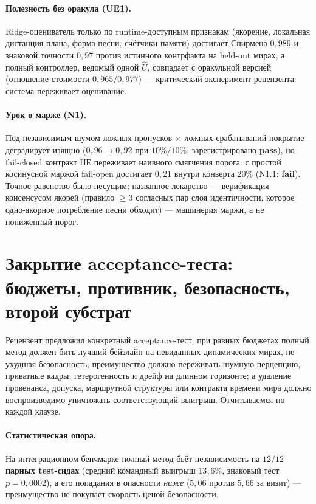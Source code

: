 \documentclass{article}
\begin{document}
\paragraph{Полезность без оракула (UE1).} Ridge-оцениватель только по
runtime-доступным признакам (якорение, локальная дистанция плана,
форма песни, счётчики памяти) достигает Спирмена $0{,}989$ и знаковой
точности $0{,}97$ против истинного контрфакта на held-out мирах, а
полный контроллер, ведомый одной $\widehat U$, совпадает с оракульной
версией (отношение стоимости $0{,}965/0{,}977$) --- критический
эксперимент рецензента: система переживает оценивание.

\paragraph{Урок о марже (N1).} Под независимым шумом ложных
пропусков $\times$ ложных срабатываний покрытие деградирует изящно
($0{,}96 \to 0{,}92$ при $10\%/10\%$: зарегистрировано
\textbf{pass}), но fail-closed контракт НЕ переживает наивного
смягчения порога: с простой косинусной маржой fail-open достигает
$0{,}21$ внутри конверта $20\%$ (N1.1: \textbf{fail}). Точное
равенство было несущим; названное лекарство --- верификация
консенсусом якорей (правило $\ge 3$ согласных пар слоя идентичности,
которое одно-якорное потребление песни обходит) --- машинерия маржи,
а не пониженный порог.


\section{Закрытие acceptance-теста: бюджеты, противник, безопасность,
второй субстрат}
\label{p5:sec:acceptance}

Рецензент предложил конкретный acceptance-тест: при равных бюджетах
полный метод должен бить лучший бейзлайн на невиданных динамических
мирах, не ухудшая безопасность; преимущество должно переживать шумную
перцепцию, приватные кадры, гетерогенность и дрейф на длинном
горизонте; а удаление провенанса, допуска, маршрутной структуры или
контракта времени мира должно воспроизводимо уничтожать
соответствующий выигрыш. Отчитываемся по каждой клаузе.

\paragraph{Статистическая опора.} На интеграционном бенчмарке полный
метод бьёт независимость на \textbf{$12/12$ парных test-сидах}
(средний командный выигрыш $13{,}6\%$, знаковый тест $p = 0{,}0002$),
а его попадания в опасности \emph{ниже} ($5{,}06$ против $5{,}66$ за
визит) --- преимущество не покупает скорость ценой безопасности.
\end{document}
